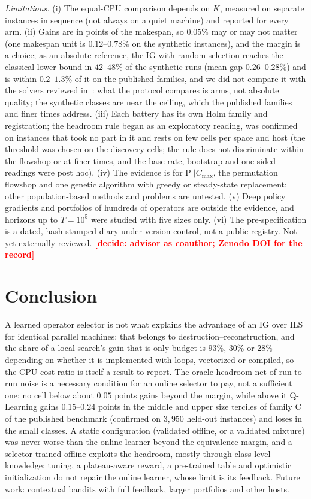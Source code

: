 \documentclass[conference,a4paper]{IEEEtran}
\newif\ifdraftmarks \draftmarkstrue
\newcommand{\todonote}[1]{\ifdraftmarks\textcolor{red}{\textbf{[#1]}}\fi}
\newcommand{\Cmax}{C_{\max}}
\begin{document}
\emph{Limitations.} (i) The equal-CPU comparison depends on $K$, measured on separate instances in sequence (not always on a quiet machine) and reported for every arm. (ii) Gains are in points of the makespan, so $0.05\%$ may or may not matter (one makespan unit is $0.12$--$0.78\%$ on the synthetic instances), and the margin is a choice; as an absolute reference, the IG with random selection reaches the classical lower bound in $42$--$48\%$ of the synthetic runs (mean gap $0.26$--$0.28\%$) and is within $0.2$--$1.3\%$ of it on the published families, and we did not compare it with the solvers reviewed in~\cite{OstojicEtAl2025}: what the protocol compares is arms, not absolute quality; the synthetic classes are near the ceiling, which the published families and finer times address.
(iii) Each battery has its own Holm family and registration; the headroom rule began as an exploratory reading, was confirmed on instances that took no part in it and rests on few cells per space and host (the threshold was chosen on the discovery cells; the rule does not discriminate within the flowshop or at finer times, and the base-rate, bootstrap and one-sided readings were post hoc). (iv) The evidence is for P$||\Cmax$, the permutation flowshop and one genetic algorithm with greedy or steady-state replacement; other population-based methods and problems are untested.
(v) Deep policy gradients and portfolios of hundreds of operators are outside the evidence, and horizons up to $T=10^5$ were studied with five sizes only. (vi) The pre-specification is a dated, hash-stamped diary under version control, not a public registry.
Not yet externally reviewed. \todonote{decide: advisor as coauthor; Zenodo DOI for the record}

\section{Conclusion}
A learned operator selector is not what explains the advantage of an IG over ILS for identical parallel machines: that belongs to destruction--reconstruction, and the share of a local search's gain that is only budget is $93\%$, $30\%$ or $28\%$ depending on whether it is implemented with loops, vectorized or compiled, so the CPU cost ratio is itself a result to report.
The oracle headroom net of run-to-run noise is a necessary condition for an online selector to pay, not a sufficient one: no cell below about $0.05$ points gains beyond the margin, while above it Q-Learning gains $0.15$--$0.24$ points in the middle and upper size terciles of family C of the published benchmark (confirmed on $3{,}950$ held-out instances) and loses in the small classes. A static configuration (validated offline, or a validated mixture) was never worse than the online learner beyond the equivalence margin, and a selector trained offline exploits the headroom, mostly through class-level knowledge;
tuning, a plateau-aware reward, a pre-trained table and optimistic initialization do not repair the online learner, whose limit is its feedback. Future work: contextual bandits with full feedback, larger portfolios and other hosts.
\end{document}
